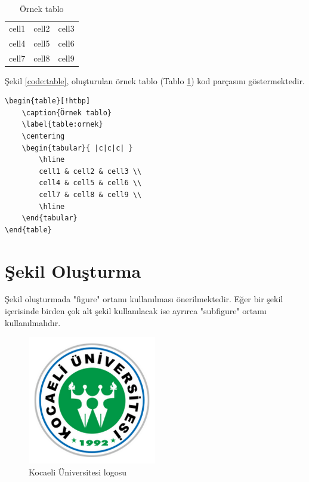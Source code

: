 \begin{table}[!htbp]
	\caption{Örnek tablo}
	\label{table:ornek}
	\centering
	\begin{tabular}{ |c|c|c| } 
		\hline
		cell1 & cell2 & cell3 \\ 
		cell4 & cell5 & cell6 \\ 
		cell7 & cell8 & cell9 \\ 
		\hline
	\end{tabular}
\end{table}

Şekil \ref{code:table}, oluşturulan örnek tablo (Tablo \ref{table:ornek}) kod parçasını göstermektedir. 

\begin{lstlisting}[language={[LaTeX]{TeX}}, label=code:table, caption=Örnek tablo yazımı]
\begin{table}[!htbp]
	\caption{Örnek tablo}
	\label{table:ornek}
	\centering
	\begin{tabular}{ |c|c|c| } 
		\hline
		cell1 & cell2 & cell3 \\ 
		cell4 & cell5 & cell6 \\ 
		cell7 & cell8 & cell9 \\ 
		\hline
	\end{tabular}
\end{table}
\end{lstlisting}

\section{Şekil Oluşturma}
Şekil oluşturmada "figure" ortamı kullanılması önerilmektedir. Eğer bir şekil içerisinde birden çok alt şekil kullanılacak ise ayrırca "subfigure" ortamı kullanılmalıdır.

\begin{figure}[!htbp]
	\centering
	\includegraphics[width=0.5\textwidth]{resimler/kou_logo.png}	
	\caption{Kocaeli Üniversitesi logosu}
	\label{fig:kou}
\end{figure}

